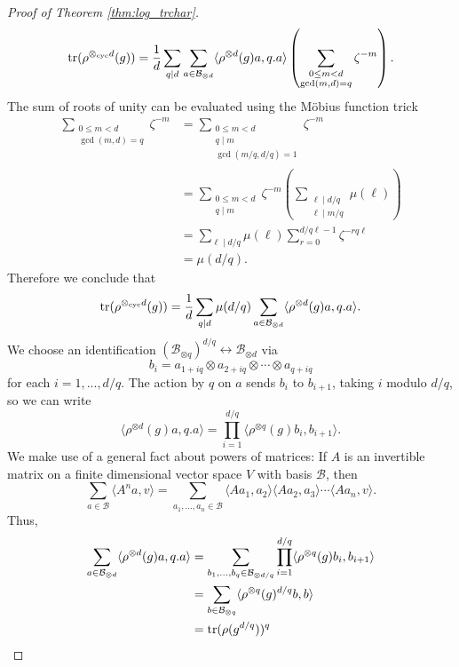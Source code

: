 \documentclass[12pt]{amsart}
\theoremstyle{plain}
\begin{document}
\begin{proof}[Proof of Theorem \ref{thm:log_trchar}]
\begin{align*}
{\rm tr}(\rho^{\otimes_{\rm cyc} d}(g)) = \frac{1}{d}\sum_{q\mid d}\sum_{a\in\mathcal{B}_{\otimes d}} \langle\rho^{\otimes d}(g)a,q.a\rangle\left(\sum_{\substack{0\le m < d\\\gcd(m,d)=q}}\zeta^{-m} \right).
\end{align*}
The sum of roots of unity can be evaluated using the M\"obius function trick
\begin{align*}
\sum_{\substack{0\le m < d\\\gcd(m,d)=q}}\zeta^{-m} &= \sum_{\substack{0\le m < d\\q\mid m\\\gcd(m/q,d/q)=1}} \zeta^{-m}\\
&=\sum_{\substack{0\le m< d\\ q\mid m}} \zeta^{-m} \left(\sum_{\substack{\ell\mid d/q\\\ell\mid m/q}} \mu(\ell)\right)\\
&= \sum_{\ell\mid d/q} \mu(\ell) \sum_{r=0}^{d/q\ell - 1} \zeta^{-rq\ell}\\
&= \mu(d/q).
\end{align*}
Therefore we conclude that
\[
{\rm tr}(\rho^{\otimes_{\rm cyc} d}(g)) = \frac{1}{d}\sum_{q\mid d}\mu(d/q)\sum_{a\in\mathcal{B}_{\otimes d}} \langle\rho^{\otimes d}(g)a,q.a\rangle.
\]
We choose an identification $(\mathcal{B}_{\otimes q})^{d/q} \leftrightarrow \mathcal{B}_{\otimes d}$ via
\[
b_i = a_{1+iq} \otimes a_{2+iq} \otimes \cdots \otimes a_{q+iq}
\]
for each $i=1,...,d/q$. The action by $q$ on $a$ sends $b_i$ to $b_{i+1}$, taking $i$ modulo $d/q$, so we can write
\[
\langle\rho^{\otimes d}(g)a,q.a\rangle = \prod_{i=1}^{d/q} \langle \rho^{\otimes q}(g) b_i, b_{i+1}\rangle.
\]
We make use of a general fact about powers of matrices: If $A$ is an invertible matrix on a finite dimensional vector space $V$ with basis $\mathcal{B}$, then
\[
\sum_{a\in \mathcal{B}}\langle A^n a, v\rangle = \sum_{a_1,...,a_n\in \mathcal{B}} \langle A a_1,a_2\rangle\langle A a_2,a_3\rangle\cdots \langle A a_n,v\rangle.
\]
Thus,
\begin{align*}
\sum_{a\in\mathcal{B}_{\otimes d}} \langle\rho^{\otimes d}(g)a,q.a\rangle &= \sum_{b_1,...,b_{q}\in\mathcal{B}_{\otimes d/q}} \prod_{i=1}^{d/q}\langle \rho^{\otimes q}(g)b_i,b_{i+1}\rangle\\
&= \sum_{b\in\mathcal{B}_{\otimes q}}\langle \rho^{\otimes q}(g)^{d/q} b,b\rangle\\
&= {\rm tr}(\rho(g^{d/q}))^{q}
\end{align*}

\end{proof}
\end{document}
